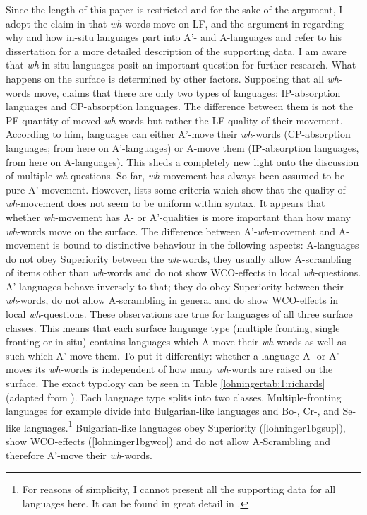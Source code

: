 \documentclass[output=paper,colorlinks,citecolor=brown]{langscibook}
\begin{document}
{Since the length of this paper is restricted and for the sake of the argument, I adopt the claim in \citet{huang1982move} that \textit{wh}-words move on LF, and the argument in \citet{richards1997} regarding why and how in-situ languages part into A'- and A-languages and refer to his dissertation for a more detailed description of the supporting data. I am aware that \textit{wh}-in-situ languages posit an important question for further research.} What happens on the surface is determined by other factors. Supposing that all \textit{wh}-words move, \citet{richards1997} claims that there are only two types of languages: IP-absorption languages and CP-absorption languages. The difference between them is not the PF-quantity of moved \textit{wh}-words but rather the LF-quality of their movement. According to him, languages can either A'-move their \textit{wh}-words (CP-absorption languages; from here on A'-languages) or A-move them (IP-absorption languages, from here on A-languages). This sheds a completely new light onto the discussion of multiple \textit{wh}-questions. So far, \textit{wh}-movement has always been assumed to be pure A'-movement. However, \citet{richards1997} lists some criteria which show that the quality of \textit{wh}-movement does not seem to be uniform within syntax. It appears that whether \textit{wh}-movement has A- or A'-qualities is more important than how many \textit{wh}-words move on the surface. The difference between A'-\textit{wh}-movement and A-movement is bound to distinctive behaviour in the following aspects: A-languages do not obey Superiority between the \textit{wh}-words, they usually allow A-scrambling of items other than \textit{wh}-words and do not show WCO-effects in local \textit{wh}-questions. A'-languages behave inversely to that; they do obey Superiority between their \textit{wh}-words, do not allow A-scrambling in general and do show WCO-effects in local \textit{wh}-questions. These observations are true for languages of all three surface classes. This means that each surface language type (multiple fronting, single fronting or in-situ) contains languages which A-move their \textit{wh}-words as well as such which A'-move them. To put it differently: whether a language A- or A'-moves its \textit{wh}-words is independent of how many \textit{wh}-words are raised on the surface. The exact typology can be seen in Table \ref{lohningertab:1:richards} (adapted from \citealp{richards1997}). 
Each language type splits into two classes. Multiple-fronting languages for example divide into Bulgarian-like languages and Bo-, Cr-, and Se-like languages.\footnote{For reasons of simplicity, I cannot present all the supporting data for all languages here. It can be found in great detail in \citet{richards1997}.} Bulgarian-like languages obey Superiority (\ref{lohninger1bgsup}), show WCO-effects (\ref{lohninger1bgwco}) and do not allow A-Scrambling and therefore A'-move their \textit{wh}-words. 
\end{document}

